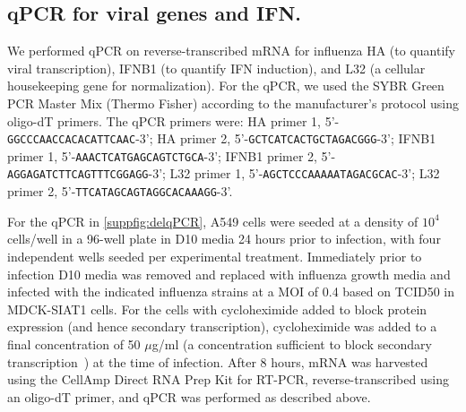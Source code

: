 \documentclass[]{asm-article}
\newcommand{\SUPPFIG}[1]{\autoref{suppfig:#1}}
\begin{document}
\subsection{qPCR for viral genes and IFN.}
We performed qPCR on reverse-transcribed mRNA for influenza HA (to quantify viral transcription), IFNB1 (to quantify IFN induction), and L32 (a cellular housekeeping gene for normalization).
For the qPCR, we used the SYBR Green PCR Master Mix (Thermo Fisher) according to the manufacturer's protocol using oligo-dT primers.
The qPCR primers were: HA primer 1, 5'-\texttt{GGCCCAACCACACATTCAAC}-3'; HA primer 2, 5'-\texttt{GCTCATCACTGCTAGACGGG}-3'; IFNB1 primer 1, 5'-\texttt{AAACTCATGAGCAGTCTGCA}-3'; IFNB1 primer 2, 5'-\texttt{AGGAGATCTTCAGTTTCGGAGG}-3'; L32 primer 1, 5'-\texttt{AGCTCCCAAAAATAGACGCAC}-3'; L32 primer 2, 5'-\texttt{TTCATAGCAGTAGGCACAAAGG}-3'. 

For the qPCR in \SUPPFIG{delqPCR}, A549 cells were seeded at a density of $10^4$ cells/well in a 96-well plate in D10 media 24 hours prior to infection, with four independent wells seeded per experimental treatment. 
Immediately prior to infection D10 media was removed and replaced with influenza growth media and infected with the indicated influenza strains at a MOI of 0.4 based on TCID50 in MDCK-SIAT1 cells.
For the cells with cycloheximide added to block protein expression (and hence secondary transcription), cycloheximide was added to a final concentration of 50 $\mu$g/ml (a concentration sufficient to block secondary transcription~\cite{killip2014activation}) at the time of infection.
After 8 hours, mRNA was harvested using the CellAmp Direct RNA Prep Kit for RT-PCR, reverse-transcribed using an oligo-dT primer, and qPCR was performed as described above.
\end{document}
